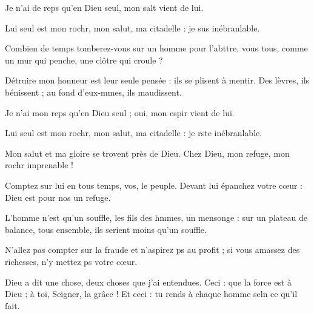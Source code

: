 \item Je n’ai de reps qu’en Dieu seul,\psstar{} mon salt vient de lui.
\item Lui seul est mon rochr, mon salut,\psstar{} ma citadelle : je sus inébranlable.
\item Combien de temps tomberez-vous sur un homme pour l’abttre, vous tous,\psstar{} comme un mur qui penche, une clôtre qui croule ?
\item Détruire mon honneur est leur seule pensée :\pscross{} ils se plisent à mentir.\psstar{} Des lèvres, ils bénissent ; au fond d’eux-mmes, ils maudissent.
\item Je n’ai mon reps qu’en Dieu seul ;\psstar{} oui, mon espir vient de lui.
\item Lui seul est mon rochr, mon salut,\psstar{} ma citadelle : je rste inébranlable.
\item Mon salut et ma gloire se trovent près de Dieu.\psstar{} Chez Dieu, mon refuge, mon rochr imprenable !
\item Comptez sur lui en tous temps, vos, le peuple.\psstar{} Devant lui épanchez votre cœur : Dieu est pour nos un refuge.
\item L’homme n’est qu’un souffle,\pscross{} les fils des hmmes, un mensonge :\psstar{} sur un plateau de balance, tous ensemble, ils serient moins qu’un souffle.
\item N’allez pas compter sur la fraude et n’aspirez ps au profit ;\psstar{} si vous amassez des richesses, n’y mettez ps votre cœur.
\item Dieu a dit une chose, deux choses que j’ai entendues.\pscross{} Ceci : que la force est à Dieu ; à toi, Seigner, la grâce !\psstar{} Et ceci : tu rends à chaque homme seln ce qu’il fait.